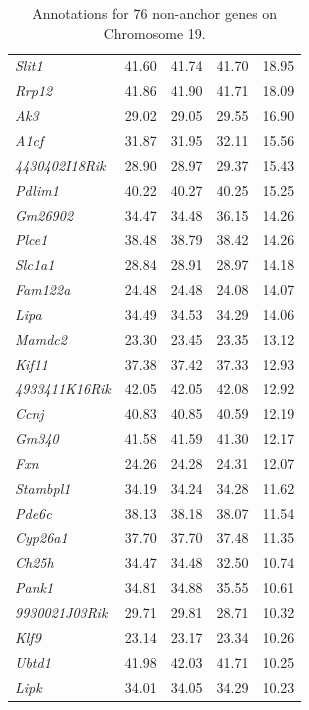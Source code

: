 \documentclass{article}
\begin{document}
\begin{table}[ht]
\begin{tabular}{>{\em}lrrrr}
  Slit1 & 41.60 & 41.74 & 41.70 & 18.95 \\ 
  Rrp12 & 41.86 & 41.90 & 41.71 & 18.09 \\ 
  Ak3 & 29.02 & 29.05 & 29.55 & 16.90 \\ 
  A1cf & 31.87 & 31.95 & 32.11 & 15.56 \\ 
  4430402I18Rik & 28.90 & 28.97 & 29.37 & 15.43 \\ 
  Pdlim1 & 40.22 & 40.27 & 40.25 & 15.25 \\ 
  Gm26902 & 34.47 & 34.48 & 36.15 & 14.26 \\ 
  Plce1 & 38.48 & 38.79 & 38.42 & 14.26 \\ 
  Slc1a1 & 28.84 & 28.91 & 28.97 & 14.18 \\ 
  Fam122a & 24.48 & 24.48 & 24.08 & 14.07 \\ 
  Lipa & 34.49 & 34.53 & 34.29 & 14.06 \\ 
  Mamdc2 & 23.30 & 23.45 & 23.35 & 13.12 \\ 
  Kif11 & 37.38 & 37.42 & 37.33 & 12.93 \\ 
  4933411K16Rik & 42.05 & 42.05 & 42.08 & 12.92 \\ 
  Ccnj & 40.83 & 40.85 & 40.59 & 12.19 \\ 
  Gm340 & 41.58 & 41.59 & 41.30 & 12.17 \\ 
  Fxn & 24.26 & 24.28 & 24.31 & 12.07 \\ 
  Stambpl1 & 34.19 & 34.24 & 34.28 & 11.62 \\ 
  Pde6c & 38.13 & 38.18 & 38.07 & 11.54 \\ 
  Cyp26a1 & 37.70 & 37.70 & 37.48 & 11.35 \\ 
  Ch25h & 34.47 & 34.48 & 32.50 & 10.74 \\ 
  Pank1 & 34.81 & 34.88 & 35.55 & 10.61 \\ 
  9930021J03Rik & 29.71 & 29.81 & 28.71 & 10.32 \\ 
  Klf9 & 23.14 & 23.17 & 23.34 & 10.26 \\ 
  Ubtd1 & 41.98 & 42.03 & 41.71 & 10.25 \\ 
  Lipk & 34.01 & 34.05 & 34.29 & 10.23 \\ 
   \hline 
\end{tabular}
\endgroup
\caption{Annotations for 76 non-anchor genes on Chromosome 19.}\label{tab:ann76}
\end{table}
\end{document}

